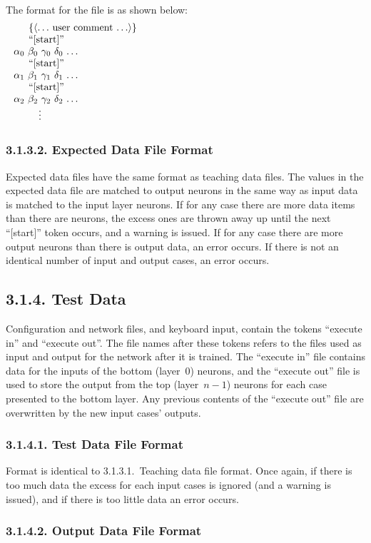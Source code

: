 \documentclass[12pt]{report}
\begin{document}
The format for the file is as shown below:
$$\vbox{
\halign{#&&\ #\cr
	\noalign{$\{\langle\ldots$ user comment $\ldots\rangle\}$}
	\noalign{``[start]''}
	$\alpha_0$&$\beta_0$&$\gamma_0$&$\delta_0$&$\ldots$\cr
	\noalign{``[start]''}
	$\alpha_1$&$\beta_1$&$\gamma_1$&$\delta_1$&$\ldots$\cr
	\noalign{``[start]''}
	$\alpha_2$&$\beta_2$&$\gamma_2$&$\delta_2$&$\ldots$\cr
	\noalign{\quad$\vdots$}
}}
$$

\subsubsection{3.1.3.2. Expected Data File Format}

Expected data files have the same format as teaching data files.
The values in the expected data file are matched to output neurons in
the same way as input data is matched to the input layer neurons.
If for any case there are more data items than there are neurons, the excess ones
are thrown away up until the next ``[start]'' token occurs, and a
warning is issued.
If for any case there are more output neurons than there is output
data, an error occurs.
If there is not an identical number of input and output cases, an
error occurs.

\subsection{3.1.4. Test Data}

Configuration and network files, and keyboard input, contain the
tokens ``execute in'' and ``execute out''.
The file names after these tokens refers to the files used as input
and output for the network after it is trained.
The ``execute in'' file contains data for the inputs of the bottom
(layer~$0$) neurons, and the ``execute out'' file is used to store
the output from the top (layer~$n-1$) neurons for each case presented to
the bottom layer.
Any previous contents of the ``execute out'' file are overwritten by
the new input cases' outputs.

\subsubsection{3.1.4.1. Test Data File Format}

Format is identical to 3.1.3.1.~Teaching data file format.
Once again, if there is too much data the excess for each input
cases is ignored (and a warning is issued), and if there is too
little data an error occurs.

\subsubsection{3.1.4.2. Output Data File Format}
\end{document}
